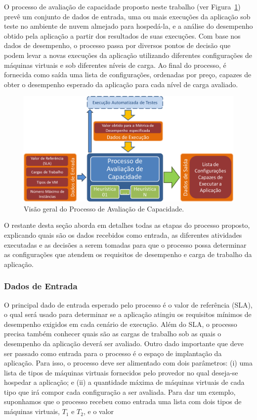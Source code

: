 \documentclass[12pt]{article}
\begin{document}
O processo de avaliação de capacidade proposto neste trabalho (ver Figura~\ref{fig:fig_processo_alto_nivel}) prevê um conjunto de dados de entrada, uma ou mais execuções da aplicação sob teste no ambiente de nuvem almejado para 
hospedá-la, e a análise do desempenho obtido pela aplicação a partir dos resultados de suas execuções. Com base nos dados de desempenho, o processo passa por diversos pontos de decisão que podem levar a novas execuções da aplicação utilizando diferentes configurações de máquinas virtuais e sob diferentes níveis de carga. Ao final do processo, é fornecida como saída uma lista de configurações, ordenadas por preço, capazes de obter o desempenho esperado da aplicação para cada nível de carga avaliado.

\begin{figure}[t]
  \begin{center}
    \includegraphics[scale=0.45]{img/processoAltoNivel}
  \end{center}
  \caption{\label{fig:fig_processo_alto_nivel}Visão geral do Processo de  Avaliação de Capacidade.}
\end{figure}

O restante desta seção aborda em detalhes todas as etapas do processo proposto, explicando quais são os dados recebidos como entrada, as diferentes atividades executadas e as decisões a serem tomadas para que o processo possa determinar as configurações que atendem os requisitos de desempenho e carga de trabalho da aplicação.

\subsubsection{Dados de Entrada}

O principal dado de entrada esperado pelo processo é o valor de referência (SLA), o qual será usado para determinar 
se a aplicação atingiu os requisitos mínimos de desempenho exigidos em cada cenário de execução. Além do SLA, o processo precisa também conhecer quais são as cargas de trabalho sob as quais o desempenho da aplicação deverá ser avaliado. Outro dado importante que deve ser passado como entrada para o processo é o espaço de implantação da aplicação. Para isso, o processo deve ser alimentado com dois parâmetros: (i) uma lista de tipos de máquinas virtuais fornecidos pelo provedor no qual deseja-se hospedar a aplicação; e (ii) a quantidade máxima de máquinas virtuais de cada tipo que irá compor cada configuração a ser avaliada. Para dar um exemplo, suponhamos que o processo recebeu como entrada uma lista com dois tipos de máquinas virtuais, $T_{1}$ e $T_{2}$, e o valor 
\end{document}
